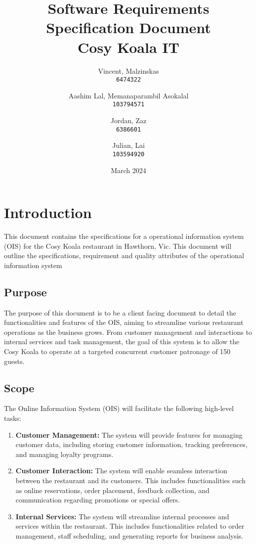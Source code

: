\documentclass{article}
\title{Software Requirements Specification
Document\\
Cosy Koala IT}
\author{
  Vincent, Malzinskas\\
  \texttt{6474322}
  \and
  Aashim Lal, Memanaparambil Asokalal\\
  \texttt{103794571}
  \and
  Jordan, Zaz\\
  \texttt{6386601}
  \and
  Julian, Lai\\
  \texttt{103594920}
}
\date{March 2024}
\begin{document}
\maketitle
\newpage
\tableofcontents
\newpage


\section{Introduction}
This document contains the specifications for a operational information system (OIS) for the Cosy Koala restaurant in Hawthorn, Vic. This document will outline the specifications, requirement and quality attributes of the operational information system

\subsection{Purpose}
The purpose of this document is to be a client facing document to detail the functionalities and features of the OIS, aiming to streamline various restaurant operations as the business grows. From customer management and interactions to internal services and task management, the goal of this system is to allow the Cosy Koala to operate at a targeted concurrent customer patronage of 150 guests.

\subsection{Scope}

The Online Information System (OIS) will facilitate the following high-level tasks:

\begin{enumerate}
    \item \textbf{Customer Management:} The system will provide features for managing customer data, including storing customer information, tracking preferences, and managing loyalty programs.
    
    \item \textbf{Customer Interaction:} The system will enable seamless interaction between the restaurant and its customers. This includes functionalities such as online reservations, order placement, feedback collection, and communication regarding promotions or special offers.
    
    \item \textbf{Internal Services:} The system will streamline internal processes and services within the restaurant. This includes functionalities related to order management, staff scheduling, and generating reports for business analysis.
\end{enumerate}
\end{document}

